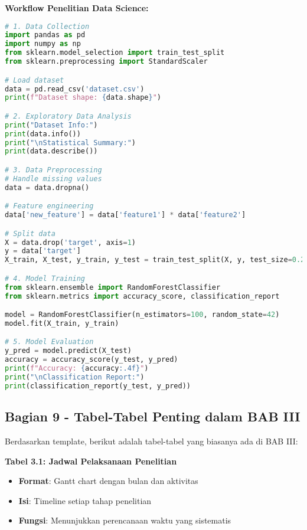 \textbf{Workflow Penelitian Data Science:}
\begin{lstlisting}[language=python, style=python, caption=Workflow Penelitian Data Science]
# 1. Data Collection
import pandas as pd
import numpy as np
from sklearn.model_selection import train_test_split
from sklearn.preprocessing import StandardScaler

# Load dataset
data = pd.read_csv('dataset.csv')
print(f"Dataset shape: {data.shape}")

# 2. Exploratory Data Analysis
print("Dataset Info:")
print(data.info())
print("\nStatistical Summary:")
print(data.describe())

# 3. Data Preprocessing
# Handle missing values
data = data.dropna()

# Feature engineering
data['new_feature'] = data['feature1'] * data['feature2']

# Split data
X = data.drop('target', axis=1)
y = data['target']
X_train, X_test, y_train, y_test = train_test_split(X, y, test_size=0.2, random_state=42)

# 4. Model Training
from sklearn.ensemble import RandomForestClassifier
from sklearn.metrics import accuracy_score, classification_report

model = RandomForestClassifier(n_estimators=100, random_state=42)
model.fit(X_train, y_train)

# 5. Model Evaluation
y_pred = model.predict(X_test)
accuracy = accuracy_score(y_test, y_pred)
print(f"Accuracy: {accuracy:.4f}")
print("\nClassification Report:")
print(classification_report(y_test, y_pred))
\end{lstlisting}

\subsection*{Bagian 9 - Tabel-Tabel Penting dalam BAB III}

Berdasarkan template, berikut adalah tabel-tabel yang biasanya ada di BAB III:

\textbf{Tabel 3.1: Jadwal Pelaksanaan Penelitian}
\begin{itemize}
    \item \textbf{Format}: Gantt chart dengan bulan dan aktivitas
    \item \textbf{Isi}: Timeline setiap tahap penelitian
    \item \textbf{Fungsi}: Menunjukkan perencanaan waktu yang sistematis
\end{itemize}

